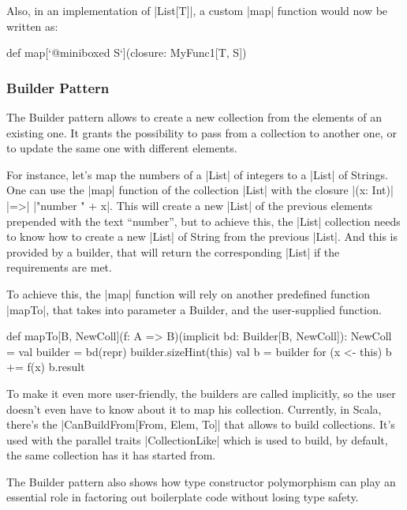 Also, in an implementation of |List[T]|, a custom |map| function would now be written as:

\begin{lstlisting-nobreak}
 def map[`@miniboxed S`](closure: MyFunc1[T, S])
\end{lstlisting-nobreak}

\subsubsection{Builder Pattern}

The Builder pattern allows to create a new collection from the elements of an existing one. It grants the possibility to pass from a collection to another one, or to update the same one with different elements.


For instance, let's map the numbers of a |List| of integers to a |List| of Strings. One can use the |map| function of the collection |List| with the closure |(x: Int)| |=>| |"number " + x|. This will create a new |List| of the previous elements prepended with the text ``number'', but to achieve this, the |List| collection needs to know how to create a new |List| of String from the previous |List|. And this is provided by a builder, that will return the corresponding |List| if the requirements are met.

To achieve this, the |map| function will rely on another predefined function |mapTo|, that takes into parameter a Builder, and the user-supplied function.

\begin{lstlisting-nobreak}
 def mapTo[B, NewColl](f: A => B)(implicit bd: Builder[B, NewColl]): NewColl = {
   val builder = bd(repr)
   builder.sizeHint(this)
   val b = builder
   for (x <- this) b += f(x)
   b.result
 }
\end{lstlisting-nobreak}

To make it even more user-friendly, the builders are called implicitly, so the user doesn't even have to know about it to map his collection. Currently, in Scala, there's the |CanBuildFrom[From, Elem, To]| that allows to build collections. It's used with the parallel traits |CollectionLike| which is used to build, by default, the same collection has it has started from.

The Builder pattern also shows how type constructor polymorphism can play an essential role in factoring out boilerplate code without losing type safety.\cite{adriaan}

